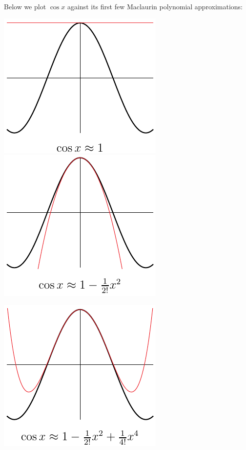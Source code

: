 \begin{eg}
Below we plot $\cos x$ against its first few Maclaurin polynomial
approximations:
\begin{efig}
\begin{center}

  \includegraphics{approx1d} \qquad\qquad
  \includegraphics{approx2d}
\end{center}
\begin{center}
  \includegraphics{approx3d} \qquad\qquad

\end{center}
\end{efig}
\end{eg}
